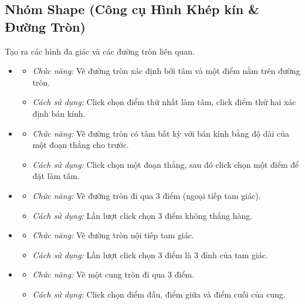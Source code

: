 \documentclass[12pt,a4paper]{article}
\begin{document}
\subsection{Nhóm Shape (Công cụ Hình Khép kín \& Đường Tròn)}
Tạo ra các hình đa giác và các đường tròn liên quan.
\begin{itemize}[label=\textcolor{primary}{\faDrawPolygon}]
    \item {}
    \begin{itemize}
        \item \textit{Chức năng:} Vẽ đường tròn xác định bởi tâm và một điểm nằm trên đường tròn.
        \item \textit{Cách sử dụng:} Click chọn điểm thứ nhất làm tâm, click điểm thứ hai xác định bán kính.
    \end{itemize}

    \item {}
    \begin{itemize}
        \item \textit{Chức năng:} Vẽ đường tròn có tâm bất kỳ với bán kính bằng độ dài của một đoạn thẳng cho trước.
        \item \textit{Cách sử dụng:} Click chọn một đoạn thẳng, sau đó click chọn một điểm để đặt làm tâm.
    \end{itemize}

    \item {}
    \begin{itemize}
        \item \textit{Chức năng:} Vẽ đường tròn đi qua 3 điểm (ngoại tiếp tam giác).
        \item \textit{Cách sử dụng:} Lần lượt click chọn 3 điểm không thẳng hàng.
    \end{itemize}
    
    \item {}
    \begin{itemize}
        \item \textit{Chức năng:} Vẽ đường tròn nội tiếp tam giác.
        \item \textit{Cách sử dụng:} Lần lượt click chọn 3 điểm là 3 đỉnh của tam giác.
    \end{itemize}

    \item {}
    \begin{itemize}
        \item \textit{Chức năng:} Vẽ một cung tròn đi qua 3 điểm.
        \item \textit{Cách sử dụng:} Click chọn điểm đầu, điểm giữa và điểm cuối của cung.
    \end{itemize}


\end{itemize}
\end{document}
